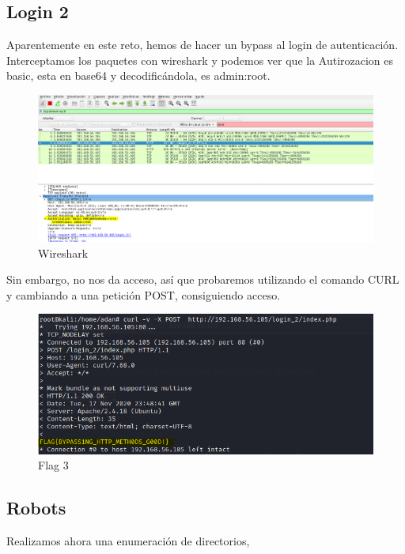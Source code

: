 \documentclass[12pt,twoside]{article}
\begin{document}
\subsection{Login 2}

Aparentemente en este reto, hemos de hacer un bypass al login de autenticación.
Interceptamos los paquetes con wireshark y podemos ver que la Autirozacion es basic, esta en base64 y decodificándola, es admin:root. 
\begin{figure}[h]
    \centering
    \includegraphics[scale=0.25]{./imagenes/wireshark}
    \caption{Wireshark}
\end{figure}

Sin embargo, no nos da acceso, así que probaremos utilizando el comando CURL y cambiando a una petición POST, consiguiendo acceso.

\newpage

\begin{figure}[h]
    \centering
    \includegraphics[scale=0.6]{./imagenes/flag_bypass}
    \caption{Flag 3}
\end{figure}

\subsection{Robots}
Realizamos ahora una enumeración de directorios, 
\end{document}

